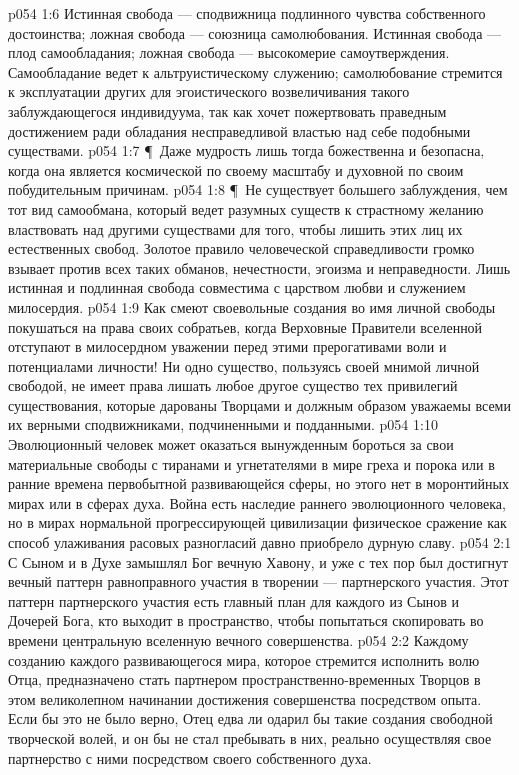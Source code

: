 \vs p054 1:6 Истинная свобода --- сподвижница подлинного чувства собственного достоинства; ложная свобода --- союзница самолюбования. Истинная свобода --- плод самообладания; ложная свобода --- высокомерие самоутверждения. Самообладание ведет к альтруистическому служению; самолюбование стремится к эксплуатации других для эгоистического возвеличивания такого заблуждающегося индивидуума, так как хочет пожертвовать праведным достижением ради обладания несправедливой властью над себе подобными существами.
\vs p054 1:7 \P\ Даже мудрость лишь тогда божественна и безопасна, когда она является космической по своему масштабу и духовной по своим побудительным причинам.
\vs p054 1:8 \P\ Не существует большего заблуждения, чем тот вид самообмана, который ведет разумных существ к страстному желанию властвовать над другими существами для того, чтобы лишить этих лиц их естественных свобод. Золотое правило человеческой справедливости громко взывает против всех таких обманов, нечестности, эгоизма и неправедности. Лишь истинная и подлинная свобода совместима с царством любви и служением милосердия.
\vs p054 1:9 Как смеют своевольные создания во имя личной свободы покушаться на права своих собратьев, когда Верховные Правители вселенной отступают в милосердном уважении перед этими прерогативами воли и потенциалами личности! Ни одно существо, пользуясь своей мнимой личной свободой, не имеет права лишать любое другое существо тех привилегий существования, которые дарованы Творцами и должным образом уважаемы всеми их верными сподвижниками, подчиненными и подданными.
\vs p054 1:10 Эволюционный человек может оказаться вынужденным бороться за свои материальные свободы с тиранами и угнетателями в мире греха и порока или в ранние времена первобытной развивающейся сферы, но этого нет в моронтийных мирах или в сферах духа. Война есть наследие раннего эволюционного человека, но в мирах нормальной прогрессирующей цивилизации физическое сражение как способ улаживания расовых разногласий давно приобрело дурную славу.
\vs p054 2:1 С Сыном и в Духе замышлял Бог вечную Хавону, и уже с тех пор был достигнут вечный паттерн равноправного участия в творении --- партнерского участия. Этот паттерн партнерского участия есть главный план для каждого из Сынов и Дочерей Бога, кто выходит в пространство, чтобы попытаться скопировать во времени центральную вселенную вечного совершенства.
\vs p054 2:2 Каждому созданию каждого развивающегося мира, которое стремится исполнить волю Отца, предназначено стать партнером пространственно\hyp{}временных Творцов в этом великолепном начинании достижения совершенства посредством опыта. Если бы это не было верно, Отец едва ли одарил бы такие создания свободной творческой волей, и он бы не стал пребывать в них, реально осуществляя свое партнерство с ними посредством своего собственного духа.
